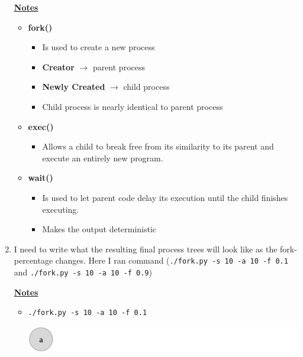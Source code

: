 \documentclass[12pt]{article}
\begin{document}
\begin{enumerate}[1.]
    \underline{\textbf{Notes}}

    \begin{itemize}
        \item \textbf{fork()}
        \begin{itemize}
            \item Is used to create a new process
            \item \textbf{Creator} $\to$ parent process
            \item \textbf{Newly Created} $\to$ child process
            \item Child process is nearly identical to parent process
        \end{itemize}

        \item \textbf{exec()}

        \begin{itemize}
            \item Allows a child to break free from its similarity to its parent and execute an entirely new program.
        \end{itemize}


        \item \textbf{wait()}
        \begin{itemize}
            \item Is used to let parent code delay its execution until the child finishes
            executing.
            \item Makes the output deterministic
        \end{itemize}
    \end{itemize}

    \item

    \bigskip

    I need to write what the resulting final process trees will look like as the
    fork-percentage changes. Here I ran command (\texttt{./fork.py -s 10 -a 10 -f 0.1} and \texttt{./fork.py -s 10 -a 10 -f 0.9})

    \underline{\textbf{Notes}}

    \begin{itemize}
        \item \texttt{./fork.py -s 10 -a 10 -f 0.1}

        \begin{center}
        \includegraphics[width=\linewidth]{images/worksheet_2_solution_6.png}
        \end{center}


\end{itemize}
\end{enumerate}
\end{document}

